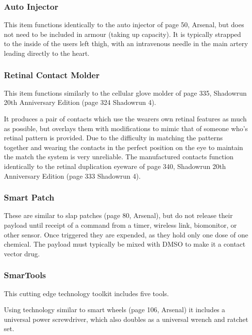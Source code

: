 \documentclass{article}
\begin{document}
\subsubsection*{Auto Injector}

This item functions identically to the auto injector of page 50, Arsenal, but does not need to be included in armour (taking up capacity).  It is typically strapped to the inside of the users left thigh, with an intravenous needle in the main artery leading directly to the heart.

\subsubsection*{Retinal Contact Molder}

This item functions similarly to the cellular glove molder of page 335, Shadowrun 20th Anniversary Edition (page 324 Shadowrun 4).  

  It produces a pair of contacts which use the wearers own retinal features as much as possible, but overlays them with modifications to mimic that of someone who's retinal pattern is provided.  Due to the difficulty in matching the patterns together and wearing the contacts in the perfect position on the eye to maintain the match the system is very unreliable.  The manufactured contacts function identically to the retinal duplication eyeware of page 340, Shadowrun 20th Anniversary Edition (page 333 Shadowrun 4).

\subsubsection*{Smart Patch}

  These are similar to slap patches (page 80, Arsenal), but do not release their payload until receipt of a command from a timer, wireless link, biomonitor, or other sensor.  Once triggered they are expended, as they hold only one dose of one chemical.  The payload must typically be mixed with DMSO to make it a contact vector drug.

\subsubsection*{SmarTools}

  This cutting edge technology toolkit includes five tools.

  Using technology similar to smart wheels (page 106, Arsenal) it includes a universal power screwdriver, which also doubles as a universal wrench and ratchet set.
  
\end{document}
